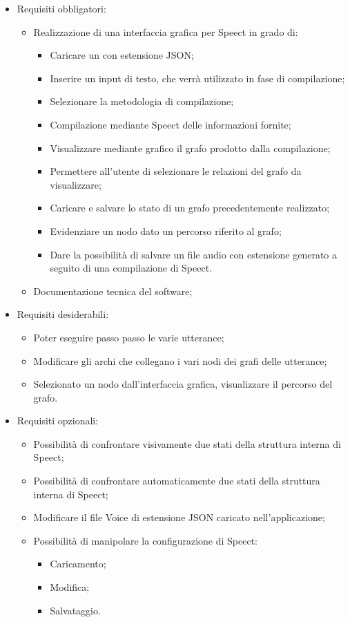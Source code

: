 \documentclass[../AnalisideiRequisiti.tex]{subfiles}
\begin{document}
\begin{itemize}
	\item{} Requisiti obbligatori:
	\begin{itemize}
		\item{}Realizzazione di una interfaccia grafica per Speect in grado di:
		\begin{itemize}
			\item{} Caricare un  con estensione JSON;
			\item{} Inserire un input di testo, che verrà utilizzato in fase di compilazione;
			\item{} Selezionare la metodologia di compilazione;
			\item{} Compilazione mediante Speect delle informazioni fornite;
			\item{} Visualizzare mediante grafico il grafo prodotto dalla compilazione;
			\item{} Permettere all'utente di selezionare le relazioni del grafo da visualizzare;
			\item{} Caricare e salvare lo stato di un grafo precedentemente realizzato;
			\item{} Evidenziare un nodo dato un percorso riferito al grafo;
			\item{} Dare la possibilità di salvare un file audio con estensione  generato a seguito di una compilazione di Speect.
		\end{itemize}
		\item{}	Documentazione tecnica del software;
	\end{itemize}
	\item{} Requisiti desiderabili:
	\begin{itemize}
		\item{} Poter eseguire passo passo le varie utterance;
		\item{}	Modificare gli archi che collegano i vari nodi dei grafi delle utterance;
		\item{} Selezionato un nodo dall'interfaccia grafica, visualizzare il percorso del grafo.
	\end{itemize}
	\item{} Requisiti opzionali:
	\begin{itemize}
		\item{}	Possibilità di confrontare visivamente due stati della struttura interna di Speect;
		\item{} Possibilità di confrontare automaticamente due stati della struttura interna di Speect;
		\item{}Modificare il file Voice di estensione JSON caricato nell'applicazione;
		\item{}	Possibilità di manipolare la configurazione di Speect:
		\begin{itemize}
			\item{} Caricamento;
			\item{}	Modifica;
			\item{} Salvataggio.
		\end{itemize}
	\end{itemize}
	
\end{itemize}
\end{document}
